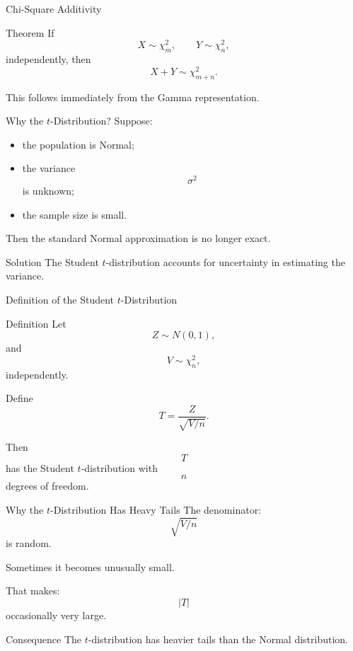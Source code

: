 \begin{frame}{Chi-Square Additivity}
\begin{keybox}{Theorem}
If
\[
X\sim \chi_m^2,
\qquad
Y\sim \chi_n^2,
\]
independently, then
\[
\boxed{
X+Y
\sim
\chi_{m+n}^2.
}
\]
\end{keybox}

\vspace{0.25cm}

This follows immediately from the Gamma representation.
\end{frame}


\begin{frame}{Why the \(t\)-Distribution?}
Suppose:
\begin{itemize}
    \item the population is Normal;
    \item the variance
    \[
    \sigma^2
    \]
    is unknown;
    \item the sample size is small.
\end{itemize}

\vspace{0.25cm}

Then the standard Normal approximation is no longer exact.

\vspace{0.25cm}

\begin{keybox}{Solution}
The Student \(t\)-distribution accounts for uncertainty in estimating the variance.
\end{keybox}
\end{frame}

\begin{frame}{Definition of the Student \(t\)-Distribution}
\begin{keybox}{Definition}
Let
\[
Z\sim N(0,1),
\]
and
\[
V\sim \chi_n^2,
\]
independently.

Define
\[
\boxed{
T
=
\frac{
Z
}{
\sqrt{V/n}
}.
}
\]

Then
\[
T
\]
has the Student \(t\)-distribution with
\[
n
\]
degrees of freedom.
\end{keybox}
\end{frame}

\begin{frame}{Why the \(t\)-Distribution Has Heavy Tails}
The denominator:
\[
\sqrt{V/n}
\]
is random.

\vspace{0.25cm}

Sometimes it becomes unusually small.

\vspace{0.25cm}

That makes:
\[
|T|
\]
occasionally very large.

\vspace{0.25cm}

\begin{keybox}{Consequence}
The \(t\)-distribution has heavier tails than the Normal distribution.
\end{keybox}
\end{frame}

